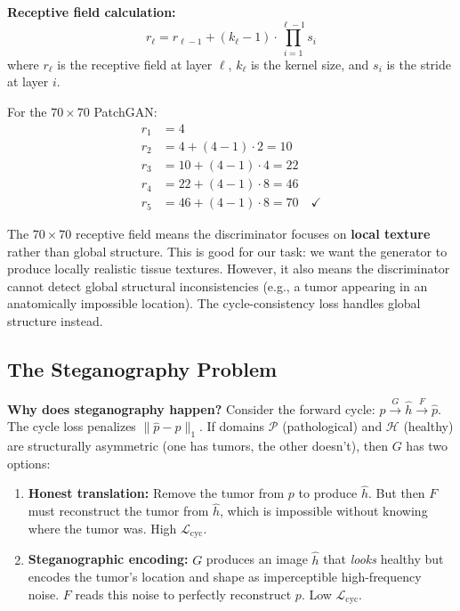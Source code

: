 \documentclass[11pt,a4paper]{article}
\theoremstyle{definition}
\begin{document}
\textbf{Receptive field calculation:}
\begin{equation}
    r_\ell = r_{\ell-1} + (k_\ell - 1) \cdot \prod_{i=1}^{\ell-1} s_i
\end{equation}
where $r_\ell$ is the receptive field at layer $\ell$, $k_\ell$ is the kernel size, and $s_i$ is the stride at layer $i$.

For the $70 \times 70$ PatchGAN:
\begin{align}
    r_1 &= 4 \\
    r_2 &= 4 + (4-1) \cdot 2 = 10 \\
    r_3 &= 10 + (4-1) \cdot 4 = 22 \\
    r_4 &= 22 + (4-1) \cdot 8 = 46 \\
    r_5 &= 46 + (4-1) \cdot 8 = 70 \quad \checkmark
\end{align}

\begin{keyinsight}
The $70 \times 70$ receptive field means the discriminator focuses on \textbf{local texture} rather than global structure. This is good for our task: we want the generator to produce locally realistic tissue textures. However, it also means the discriminator cannot detect global structural inconsistencies (e.g., a tumor appearing in an anatomically impossible location). The cycle-consistency loss handles global structure instead.
\end{keyinsight}

\subsection{The Steganography Problem}

\textbf{Why does steganography happen?} Consider the forward cycle: $p \xrightarrow{G} \hat{h} \xrightarrow{F} \hat{p}$. The cycle loss penalizes $\|\hat{p} - p\|_1$. If domains $\mathcal{P}$ (pathological) and $\mathcal{H}$ (healthy) are structurally asymmetric (one has tumors, the other doesn't), then $G$ has two options:

\begin{enumerate}
    \item \textbf{Honest translation:} Remove the tumor from $p$ to produce $\hat{h}$. But then $F$ must reconstruct the tumor from $\hat{h}$, which is impossible without knowing where the tumor was. High $\mathcal{L}_{\text{cyc}}$.

    \item \textbf{Steganographic encoding:} $G$ produces an image $\hat{h}$ that \emph{looks} healthy but encodes the tumor's location and shape as imperceptible high-frequency noise. $F$ reads this noise to perfectly reconstruct $p$. Low $\mathcal{L}_{\text{cyc}}$.
\end{enumerate}
\end{document}
